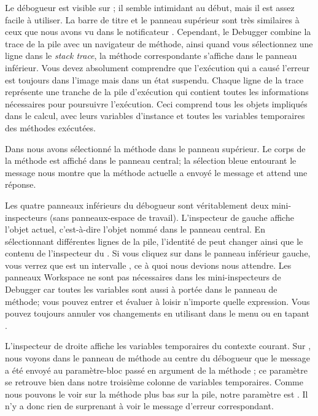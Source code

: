 \documentclass[a4paper,10pt,twoside]{book}
\begin{document}
Le débogueur est visible sur ; 
il semble intimidant au début, mais il est assez facile à utiliser.
La barre de titre et le panneau supérieur sont très similaires
à ceux que nous avons vu dans le notificateur .
Cependant, le Debugger combine la trace de la pile avec un navigateur de
méthode, ainsi quand vous sélectionnez une ligne dans le \emph{stack
trace}, la méthode correspondante s'affiche dans le panneau inférieur.
Vous devez absolument comprendre que l'exécution qui a causé l'erreur
est toujours dans l'image mais dans un état suspendu.
Chaque ligne de la trace représente une tranche de la pile
d'exécution qui contient toutes les informations nécessaires
pour poursuivre l'exécution. Ceci comprend tous les objets impliqués
dans le calcul, avec leurs variables d'instance et toutes les variables
temporaires des méthodes exécutées.

Dans  nous avons sélectionné
la méthode  dans le panneau supérieur.
Le corps de la méthode est affiché dans le panneau central;
la sélection bleue entourant le message  nous montre
que la méthode actuelle a envoyé le message  et
attend une réponse.

Les quatre panneaux inférieurs du débogueur sont véritablement deux
mini-inspecteurs (sans panneaux-espace de travail).
L'inspecteur de gauche affiche l'objet actuel,
c'est-à-dire l'objet nommé \self dans le panneau central.
En sélectionnant différentes lignes de la pile, l'identité de \self
peut changer ainsi que le contenu de
l'inspecteur du \self{}.
Si vous cliquez sur \self dans le panneau inférieur gauche, vous verrez
que \self est un intervalle , ce à quoi nous devions
nous attendre.
Les panneaux Workspace ne sont pas nécessaires dans les mini-inspecteurs
de Debugger car toutes les variables sont aussi à portée dans
le panneau de méthode; vous pouvez entrer et évaluer à loisir 
n'importe quelle expression.
Vous pouvez toujours annuler vos changements en utilisant 
 dans le menu ou en tapant . 

L'inspecteur de droite affiche les variables temporaires du contexte courant.
Sur ,
nous voyons dans le panneau de méthode au centre du débogueur que le message
 a été envoyé au paramètre-bloc  passé en argument de la
méthode ;
ce paramètre se retrouve bien dans notre troisième colonne de variables temporaires.
Comme nous pouvons le voir sur la méthode  plus bas sur la
  pile, notre paramètre  est . Il n'y
a donc rien de surprenant à voir le message d'erreur correspondant.
\end{document}

